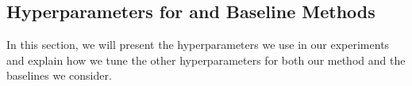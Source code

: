 \documentclass[../thesis.tex]{subfiles}
\begin{document}


\subsection{Hyperparameters for \ptrmethodname and Baseline Methods}
\label{app:hyperparams}

In this section, we will present the hyperparameters we use in our experiments and explain how we tune the other hyperparameters for both our method \ptrmethodname and the baselines we consider.  
\end{document}
